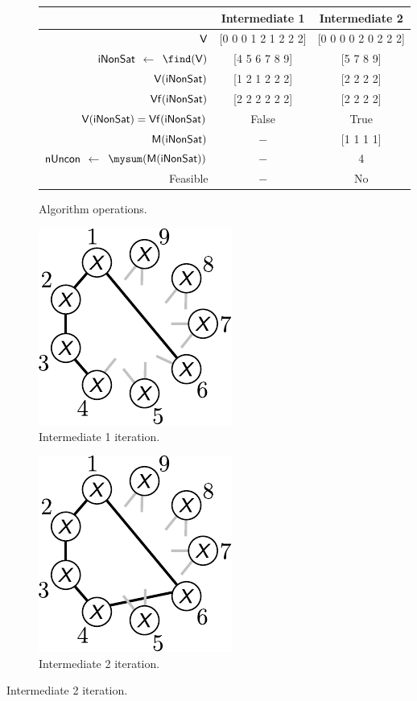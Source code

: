 \begin{figure}[!ht]

\begin{subfigure}[b]{\textwidth}
\centering
\begin{tabular}{r | c | c}
\hline \hline
& Intermediate 1 & Intermediate 2 \\
\hline 
$\textup{\textsf{V}}$ & [0 0 0 1 2 1 2 2 2] & [0 0 0 0 2 0 2 2 2] \\
$\textup{\textsf{iNonSat}}$ $\leftarrow$ $\find(\xvar{V})$ & [4 5 6 7 8 9] & [5 7 8 9] \\
$\textup{\textsf{V}}(\textup{\textsf{iNonSat}})$ & [1 2 1 2 2 2] & [2 2 2 2] \\
$\textup{\textsf{Vf}}(\textup{\textsf{iNonSat}})$ & [2 2 2 2 2 2] & [2 2 2 2] \\
$\textup{\textsf{V}}(\textup{\textsf{iNonSat}}) = \textup{\textsf{Vf}}(\textup{\textsf{iNonSat}})$ & False & True  \\
$\textup{\textsf{M}}(\textup{\textsf{iNonSat}})$ & $-$ & [1 1 1 1] \\
$\textup{\textsf{nUncon}}$ $\leftarrow$ $\mysum(\xvar{M}(\xvar{iNonSat}))$ & $-$ & 4 \\
Feasible & $-$ & No \\
\hline \hline
\end{tabular}
\caption{Algorithm operations.\label{tb:app1:saturated-ex2-V}}
\end{subfigure}%

\begin{subfigure}[b]{0.5\textwidth}
\centering
\includegraphics[scale=1]{../app1/fig/saturated-ex2-intermediate1_v2}
\caption{Intermediate 1 iteration.\label{fig:app1:saturated-ex2-intermediate1}}
\end{subfigure}%
\begin{subfigure}[b]{0.5\textwidth}
\centering
 \includegraphics[scale=1]{../app1/fig/saturated-ex2-intermediate2_v2}
 \caption{Intermediate 2 iteration.\label{fig:app1:saturated-ex2-intermediate2}}
\end{subfigure}%


\end{figure}
